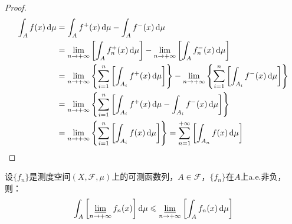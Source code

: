 \begin{proof}
\begin{align*}
		\int_{A}f(x)\dif\mu&=\int_{A}f^+(x)\dif\mu-\int_{A}f^-(x)\dif\mu \\
		&=\lim_{n\to+\infty}\left[\int_{A}f_n^+(x)\dif\mu\right]-\lim_{n\to+\infty}\left[\int_{A}f_n^-(x)\dif\mu\right] \\
		&=\lim_{n\to+\infty}\left\{\sum_{i=1}^{n}\left[\int_{A_i}f^+(x)\dif\mu\right]\right\}-\lim_{n\to+\infty}\left\{\sum_{i=1}^{n}\left[\int_{A_i}f^-(x)\dif\mu\right]\right\} \\
		&=\lim_{n\to+\infty}\left\{\sum_{i=1}^{n}\left[\int_{A_i}f^+(x)\dif\mu-\int_{A_i}f^-(x)\dif\mu\right]\right\} \\
		&=\lim_{n\to+\infty}\left\{\sum_{i=1}^{n}\left[\int_{A_i}f(x)\dif\mu\right]\right\}=\sum_{n=1}^{+\infty}\left[\int_{A_n}f(x)\dif\mu\right]\qedhere
	\end{align*}
\end{proof}
\begin{theorem}\label{theo:FatouLemma}
	设$\{f_n\}$是测度空间$(X,\mathscr{F},\mu)$上的可测函数列，$A\in\mathscr{F}$，$\{f_n\}$在$A$上a.e.非负，则：
	\begin{equation*}
		\int_{A}\left[\varliminf_{n\to+\infty}f_n(x)\right]\mathop{}\!\mathrm{d}\mu\leqslant\varliminf_{n\to+\infty}\left[\int_{A}f_n(x)\mathop{}\!\mathrm{d}\mu\right]
	\end{equation*}
\end{theorem}
